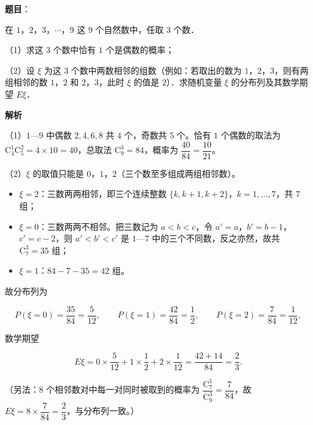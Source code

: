 \begin{answer}

\textbf{题目}：

在 $1$，$2$，$3$，$\cdots$，$9$ 这 $9$ 个自然数中，任取 $3$ 个数．

（1）求这 $3$ 个数中恰有 $1$ 个是偶数的概率；

（2）设 $\xi$ 为这 $3$ 个数中两数相邻的组数（例如：若取出的数为 $1$，$2$，$3$，则有两组相邻的数 $1$，$2$ 和 $2$，$3$，此时 $\xi$ 的值是 $2$）．求随机变量 $\xi$ 的分布列及其数学期望 $E\xi$．

\textbf{解析}

（1）$1$—$9$ 中偶数 $2,4,6,8$ 共 $4$ 个，奇数共 $5$ 个。恰有 $1$ 个偶数的取法为 $\mathrm C_4^1\mathrm C_5^2=4\times10=40$，总取法 $\mathrm C_9^3=84$，概率为 $\dfrac{40}{84}=\dfrac{10}{21}$。

（2）$\xi$ 的取值只能是 $0$，$1$，$2$（三个数至多组成两组相邻数）。

\begin{itemize}
\item $\xi=2$：三数两两相邻，即三个连续整数 $\{k,k+1,k+2\}$，$k=1,\dots,7$，共 $7$ 组；
\item $\xi=0$：三数两两不相邻。把三数记为 $a<b<c$，令 $a'=a$，$b'=b-1$，$c'=c-2$，则 $a'<b'<c'$ 是 $1$—$7$ 中的三个不同数，反之亦然，故共 $\mathrm C_7^3=35$ 组；
\item $\xi=1$：$84-7-35=42$ 组。
\end{itemize}

故分布列为

\nopagebreak[4]
\[P(\xi=0)=\frac{35}{84}=\frac{5}{12},\qquad P(\xi=1)=\frac{42}{84}=\frac12,\qquad P(\xi=2)=\frac{7}{84}=\frac1{12},\]

数学期望

\nopagebreak[4]
\[E\xi=0\times\frac{5}{12}+1\times\frac12+2\times\frac1{12}=\frac{42+14}{84}=\frac23.\]

（另法：$8$ 个相邻数对中每一对同时被取到的概率为 $\dfrac{\mathrm C_7^1}{\mathrm C_9^3}=\dfrac{7}{84}$，故 $E\xi=8\times\dfrac{7}{84}=\dfrac23$，与分布列一致。）


\end{answer}
